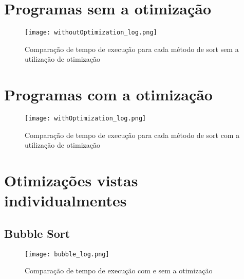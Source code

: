 \documentclass[a4paper, 12pt]{article}
\begin{document}
\section{Programas sem a otimização}

\begin{figure}[H]
\centering
\texttt{[image: withoutOptimization\_log.png]}
\caption{}{Comparação de tempo de execução para cada método de sort sem a utilização de otimização}
\label{fig:without_otimization}
\end{figure}


\vspace{0.75cm} %

\section{Programas com a otimização}
\begin{figure}[H]
	\centering
	\texttt{[image: withOptimization\_log.png]}
	\caption{}{Comparação de tempo de execução para cada método de sort com a utilização de otimização}
	\label{fig:with_otimization}
\end{figure}


\section{Otimizações vistas individualmentes}

\subsection{Bubble Sort}
\begin{figure}[H]
	\centering
	\texttt{[image: bubble\_log.png]}
	\caption{}{Comparação de tempo de execução  com e sem  a otimização}
	\label{fig:bubble}
\end{figure}
\end{document}
